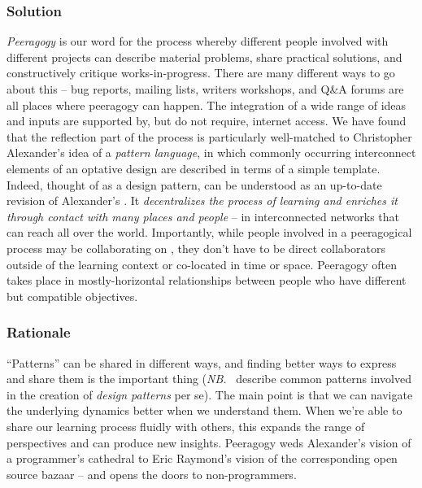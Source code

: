 \subsubsection*{Solution} \emph{Peeragogy} is our word for the process whereby different people involved with different projects can describe material problems, share practical solutions, and constructively critique works-in-progress.   There are many different ways to go about this -- bug reports, mailing lists, writers workshops, and Q\&A forums are all places where peeragogy can happen.  The integration of a wide range of ideas and inputs are supported by, but do not require, internet access.  We have found that the reflection part of the process is particularly well-matched to Christopher Alexander's idea of a \emph{pattern language}, in which commonly occurring  interconnect elements of an optative design are described in terms of a simple template.  Indeed, thought of as a design pattern,  can be understood as an up-to-date revision of Alexander's  \cite[p. 99]{alexander1977pattern}.  It \emph{decentralizes the process of learning and enriches it through contact with many places and people} -- in interconnected networks that can reach all over the world.   Importantly, while people involved in a peeragogical process may be collaborating on , they don't have to be direct collaborators outside of the learning context or co-located in time or space.  Peeragogy often takes place in mostly-horizontal relationships between people who have different but compatible objectives.  

\subsubsection*{Rationale}
``Patterns'' can be shared in different ways, and finding better ways to express and share them is the important thing (\emph{NB.}~\cite{meszaros1998pattern} describe common patterns involved in the creation of \emph{design patterns} per se).  The main point is that we can navigate the underlying dynamics better when we understand them.  When we're able to share our learning process fluidly with others, this expands the range of perspectives and can produce new insights.  Peeragogy weds Alexander's vision of a programmer's cathedral to Eric Raymond's vision of the corresponding open source bazaar \cite{raymond2001cathedral} -- and opens the doors to non-programmers.

